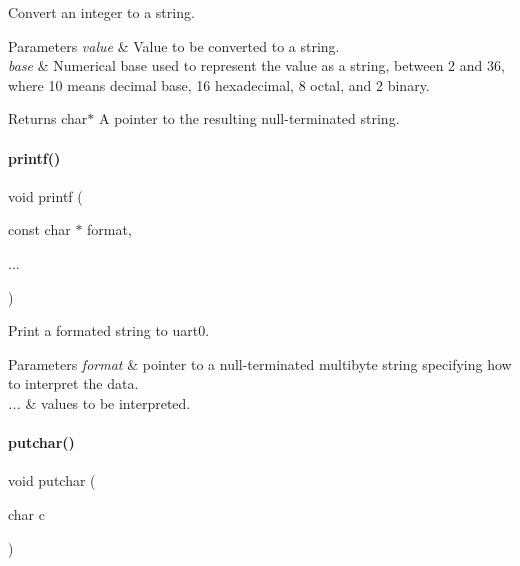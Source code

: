 Convert an integer to a string. 


\begin{DoxyParams}{Parameters}
{\em value} & Value to be converted to a string. \\
\hline
{\em base} & Numerical base used to represent the value as a string, between 2 and 36, where 10 means decimal base, 16 hexadecimal, 8 octal, and 2 binary. \\
\hline
\end{DoxyParams}
\begin{DoxyReturn}{Returns}
char$\ast$ A pointer to the resulting null-\/terminated string. 
\end{DoxyReturn}
\mbox{\label{a00026_a133c04c35a1c14c6f8d8078831705661}} 
\paragraph{\texorpdfstring{printf()}{printf()}}
{\footnotesize\ttfamily void printf (\begin{DoxyParamCaption}\item[{const char $\ast$}]{format,  }\item[{}]{... }\end{DoxyParamCaption})}



Print a formated string to uart0. 


\begin{DoxyParams}{Parameters}
{\em format} & pointer to a null-\/terminated multibyte string specifying how to interpret the data. \\
\hline
{\em ...} & values to be interpreted. \\
\hline
\end{DoxyParams}
\mbox{\label{a00026_a948b7a0779c308ac5502c57e282e6933}} 
\paragraph{\texorpdfstring{putchar()}{putchar()}}
{\footnotesize\ttfamily void putchar (\begin{DoxyParamCaption}\item[{char}]{c }\end{DoxyParamCaption})}



